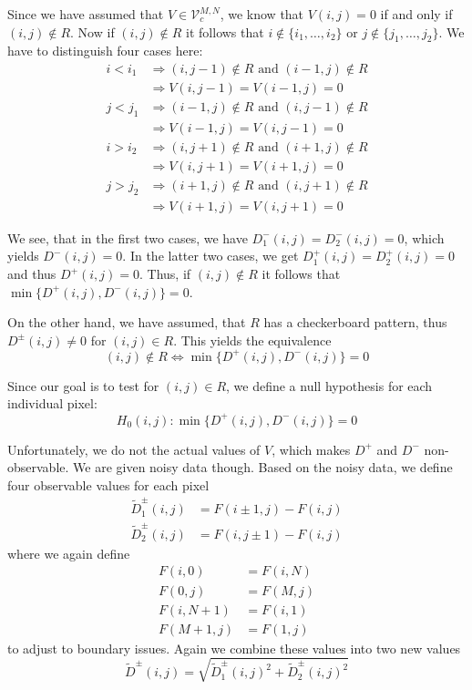 \documentclass[a4paper,12pt]{article}
\theoremstyle{plain}
\theoremstyle{definition}
\theoremstyle{remark}
\begin{document}
Since we have assumed that $V \in \mathcal{V}_c^{M, N}$, we know that $V(i, j) = 0$ if and only if $(i, j) \notin R$. Now if $(i, j) \notin R$ it follows that $i \notin \{ i_1, \dots, i_2 \}$ or $j \notin \{ j_1, \dots, j_2 \}$. We have to distinguish four cases here:
\begin{align*}
	i < i_1 &\Rightarrow (i, j - 1) \notin R \textrm{ and } (i - 1, j) \notin R \\
	&\Rightarrow V(i, j - 1) = V(i - 1, j) = 0 \\
	j < j_1 &\Rightarrow (i - 1, j) \notin R \textrm{ and } (i, j - 1) \notin R \\
	&\Rightarrow V(i - 1, j) = V(i, j - 1) = 0 \\
	i > i_2 &\Rightarrow (i, j + 1) \notin R \textrm{ and } (i + 1, j) \notin R \\
	&\Rightarrow V(i, j + 1) = V(i + 1, j) = 0 \\
	j > j_2 &\Rightarrow (i + 1, j) \notin R \textrm{ and } (i, j + 1) \notin R \\
	&\Rightarrow V(i + 1, j) = V(i, j + 1) = 0
\end{align*}

We see, that in the first two cases, we have $D^-_1(i, j) = D^-_2(i, j) = 0$, which yields $D^-(i, j) = 0$. In the latter two cases, we get $D^+_1(i, j) = D^+_2(i, j) = 0$ and thus $D^+(i, j) = 0$. Thus, if $(i, j) \notin R$ it follows that $\min \{ D^+(i, j), D^-(i, j) \} = 0$.

On the other hand, we have assumed, that $R$ has a checkerboard pattern, thus $D^\pm(i, j) \neq 0$ for $(i, j) \in R$. This yields the equivalence
\begin{equation*}
	(i, j) \notin R \Leftrightarrow \min \{ D^+(i, j), D^-(i, j) \} = 0
\end{equation*}

Since our goal is to test for $(i, j) \in R$, we define a null hypothesis for each individual pixel:
\begin{equation}
	H_0(i, j): \min \{ D^+(i, j), D^-(i, j) \} = 0
\end{equation}

Unfortunately, we do not the actual values of $V$, which makes $D^+$ and $D^-$ non-observable. We are given noisy data though. Based on the noisy data, we define four observable values for each pixel
\begin{align}
	\tilde{D}^\pm_1(i, j) &= F(i \pm 1, j) - F(i, j) \label{D1tilde} \\
	\tilde{D}^\pm_2(i, j) &= F(i, j \pm 1) - F(i, j) \label{D2tilde}
\end{align}
where we again define
\begin{align*}
	F(i, 0) &= F(i, N) \\
	F(0, j) &= F(M, j) \\
	F(i, N+1) &= F(i, 1) \\
	F(M+1, j) &= F(1, j)
\end{align*}
to adjust to boundary issues. Again we combine these values into two new values
\begin{equation}\label{Dtilde}
	\tilde{D}^\pm(i, j) = \sqrt{\tilde{D}_1^\pm(i, j)^2 + \tilde{D}_2^\pm(i, j)^2}
\end{equation}
\end{document}
